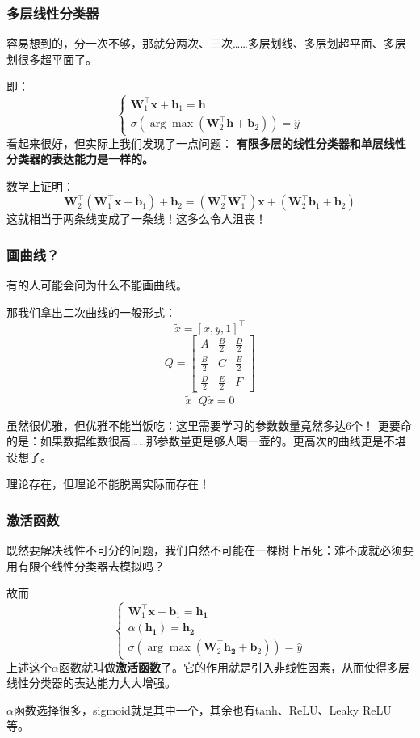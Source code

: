 \documentclass{ctexbeamer}
\begin{document}
\begin{frame}
    \frametitle{多层线性分类器}

    容易想到的，分一次不够，那就分两次、三次……多层划线、多层划超平面、多层划很多超平面了。

    即：
    \[
        \begin{cases}
            \mathbf{W}_1^\top \mathbf{x} + \mathbf{b}_1 = \mathbf{h} \\
            \sigma(\arg\max(\mathbf{W}_2^\top \mathbf{h} + \mathbf{b}_2)) = \hat{y}
        \end{cases}
    \]
    看起来很好，但实际上我们发现了一点问题：
    \textbf{有限多层的线性分类器和单层线性分类器的表达能力是一样的。}

    数学上证明：
    \[
        \mathbf{W}_2^\top (\mathbf{W}_1^\top \mathbf{x} + \mathbf{b}_1) + \mathbf{b}_2 = (\mathbf{W}_2^\top \mathbf{W}_1^\top) \mathbf{x} + (\mathbf{W}_2^\top \mathbf{b}_1 + \mathbf{b}_2)
    \]
    这就相当于两条线变成了一条线！这多么令人沮丧！

\end{frame}

\begin{frame}
    \frametitle{画曲线？}

    有的人可能会问为什么不能画曲线。

    那我们拿出二次曲线的一般形式：
    \[ \tilde{x} = [x, y, 1]^\top \]
    \[ Q =
        \begin{bmatrix}
            A & \frac{B}{2} & \frac{D}{2} \\
            \frac{B}{2} & C & \frac{E}{2} \\
            \frac{D}{2} & \frac{E}{2} & F
    \end{bmatrix} \]
    \[ \tilde{x}^\top Q \tilde{x} = 0 \]

    虽然很优雅，但优雅不能当饭吃：这里需要学习的参数数量竟然多达6个！
    更要命的是：如果数据维数很高……那参数量更是够人喝一壶的。更高次的曲线更是不堪设想了。

    理论存在，但理论不能脱离实际而存在！

\end{frame}

\begin{frame}
    \frametitle{激活函数}

    既然要解决线性不可分的问题，我们自然不可能在一棵树上吊死：难不成就必须要用有限个线性分类器去模拟吗？

    故而
    \[
        \begin{cases}
            \mathbf{W}_1^\top \mathbf{x} + \mathbf{b}_1 = \mathbf{h_1} \\
            \alpha(\mathbf{h_1}) = \mathbf{h_2} \\
            \sigma(\arg\max(\mathbf{W}_2^\top \mathbf{h_2} + \mathbf{b}_2)) = \hat{y}
        \end{cases}
    \]
    上述这个$\alpha$函数就叫做\textbf{激活函数}了。它的作用就是引入非线性因素，从而使得多层线性分类器的表达能力大大增强。

    $\alpha$函数选择很多，sigmoid就是其中一个，其余也有tanh、ReLU、Leaky ReLU等。

\end{frame}
\end{document}
